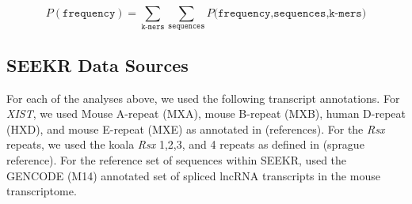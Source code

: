 $$
P(\texttt{frequency}) = \sum_{\texttt{k-mers}}{\sum_{\texttt{sequences}}{P(\texttt{frequency,sequences,k-mers)}}}
$$

\subsection{SEEKR Data Sources}
For each of the analyses above, we used the following transcript annotations. For \emph{XIST}, we used Mouse A-repeat (MXA), mouse B-repeat (MXB), human D-repeat (HXD), and mouse E-repeat (MXE) as annotated in (references). For the \emph{Rsx} repeats, we used the koala \emph{Rsx} 1,2,3, and 4 repeats as defined in (sprague reference). For the reference set of sequences within SEEKR, used the GENCODE (M14) annotated set of spliced lncRNA transcripts in the mouse transcriptome. 